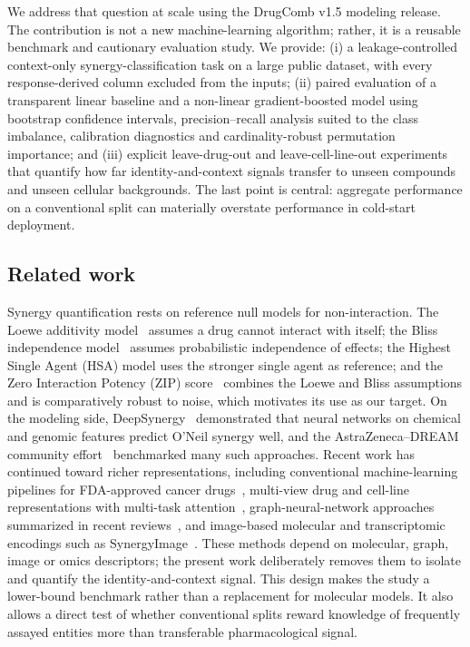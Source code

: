 \documentclass[11pt]{article}
\begin{document}
We address that question at scale using the DrugComb v1.5 modeling release. The contribution is not a
new machine-learning algorithm; rather, it is a reusable benchmark and cautionary evaluation study. We
provide: (i) a leakage-controlled context-only synergy-classification task on a large public dataset,
with every response-derived column excluded from the inputs; (ii) paired evaluation of a transparent
linear baseline and a non-linear gradient-boosted model using bootstrap confidence intervals,
precision--recall analysis suited to the class imbalance, calibration diagnostics and
cardinality-robust permutation importance; and (iii) explicit leave-drug-out and leave-cell-line-out
experiments that quantify how far identity-and-context signals transfer to unseen compounds and
unseen cellular backgrounds. The last point is central: aggregate performance on a conventional split
can materially overstate performance in cold-start deployment.

\subsection{Related work}
Synergy quantification rests on reference null models for non-interaction. The Loewe additivity
model~\cite{loewe1953} assumes a drug cannot interact with itself; the Bliss independence
model~\cite{bliss1939} assumes probabilistic independence of effects; the Highest Single Agent (HSA)
model uses the stronger single agent as reference; and the Zero Interaction Potency (ZIP)
score~\cite{yadav2015} combines the Loewe and Bliss assumptions and is comparatively robust to noise,
which motivates its use as our target. On the modeling side, DeepSynergy~\cite{preuer2018} demonstrated
that neural networks on chemical and genomic features predict O'Neil synergy well, and the
AstraZeneca--DREAM community effort~\cite{menden2019} benchmarked many such approaches. Recent work has
continued toward richer representations, including conventional machine-learning pipelines for
FDA-approved cancer drugs~\cite{abdelhafeez2024}, multi-view drug and cell-line representations with
multi-task attention~\cite{monem2024}, graph-neural-network approaches summarized in recent
reviews~\cite{besharatifard2024}, and image-based molecular and transcriptomic encodings such as
SynergyImage~\cite{mehrabani2025}. These methods depend on molecular, graph, image or omics
descriptors; the present work deliberately removes them to isolate and quantify the
identity-and-context signal. This design makes the study a lower-bound benchmark rather than a
replacement for molecular models. It also allows a direct test of whether conventional splits reward
knowledge of frequently assayed entities more than transferable pharmacological signal.
\end{document}
